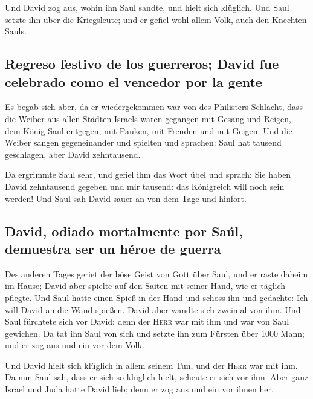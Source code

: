  Und David zog aus, wohin ihn Saul sandte, und hielt sich
klüglich. Und Saul setzte ihn über die Kriegsleute; und er gefiel wohl
allem Volk, auch den Knechten Sauls.

\hypertarget{regreso-festivo-de-los-guerreros-david-fue-celebrado-como-el-vencedor-por-la-gente}{%
\subsection{Regreso festivo de los guerreros; David fue celebrado como
el vencedor por la
gente}\label{regreso-festivo-de-los-guerreros-david-fue-celebrado-como-el-vencedor-por-la-gente}}

 Es begab sich aber, da er wiedergekommen war von des
Philisters Schlacht, dass die Weiber aus allen Städten Israels waren
gegangen mit Gesang und Reigen, dem König Saul entgegen, mit Pauken, mit
Freuden und mit Geigen.  Und die Weiber sangen
gegeneinander und spielten und sprachen: Saul hat tausend geschlagen,
aber David zehntausend.

 Da ergrimmte Saul sehr, und gefiel ihm das Wort übel und
sprach: Sie haben David zehntausend gegeben und mir tausend: das
Königreich will noch sein werden!  Und Saul sah David
sauer an von dem Tage und hinfort.

\hypertarget{david-odiado-mortalmente-por-sauxfal-demuestra-ser-un-huxe9roe-de-guerra}{%
\subsection{David, odiado mortalmente por Saúl, demuestra ser un héroe
de
guerra}\label{david-odiado-mortalmente-por-sauxfal-demuestra-ser-un-huxe9roe-de-guerra}}

 Des anderen Tages geriet der böse Geist von Gott über
Saul, und er raste daheim im Hause; David aber spielte auf den Saiten
mit seiner Hand, wie er täglich pflegte. Und Saul hatte einen Spieß in
der Hand  und schoss ihn und gedachte: Ich will David an
die Wand spießen. David aber wandte sich zweimal von ihm.
 Und Saul fürchtete sich vor David; denn der
\textsc{Herr} war mit ihm und war von Saul gewichen.  Da
tat ihn Saul von sich und setzte ihn zum Fürsten über 1000 Mann; und er
zog aus und ein vor dem Volk.

 Und David hielt sich klüglich in allem seinem Tun, und
der \textsc{Herr} war mit ihm.  Da nun Saul sah, dass er
sich so klüglich hielt, scheute er sich vor ihm.  Aber
ganz Israel und Juda hatte David lieb; denn er zog aus und ein vor ihnen
her.

